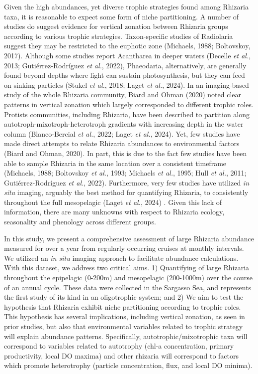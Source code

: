\documentclass[
]{article}
\begin{document}
Given the high abundances, yet diverse trophic strategies found among
Rhizaria taxa, it is reasonable to expect some form of niche
partitioning. A number of studies do suggest evidence for vertical
zonation between Rhizaria groups according to various trophic
strategies. Taxon-specific studies of Radiolaria suggest they may be
restricted to the euphotic zone (Michaels, 1988; Boltovskoy, 2017).
Although some studies report Acantharea in deeper waters (Decelle
\emph{et al.}, 2013; Gutiérrez-Rodríguez \emph{et al.}, 2022),
Phaeodaria, alternatively, are generally found beyond depths where light
can sustain photosynthesis, but they can feed on sinking particles
(Stukel \emph{et al.}, 2018; Laget \emph{et al.}, 2024). In an
imaging-based study of the whole Rhizaria community, Biard and Ohman
(2020) noted clear patterns in vertical zonation which largely
corresponded to different trophic roles. Protists communities, including
Rhizaria, have been described to partition along
autotroph-mixotroph-heterotroph gradients with increasing depth in the
water column (Blanco-Bercial \emph{et al.}, 2022; Laget \emph{et al.},
2024). Yet, few studies have made direct attempts to relate Rhizaria
abundances to environmental factors (Biard and Ohman, 2020). In part,
this is due to the fact few studies have been able to sample Rhizaria in
the same location over a consistent timeframe (Michaels, 1988;
Boltovskoy \emph{et al.}, 1993; Michaels \emph{et al.}, 1995; Hull
\emph{et al.}, 2011; Gutiérrez-Rodríguez \emph{et al.}, 2022).
Furthermore, very few studies have utilized \emph{in situ} imaging,
arguably the best method for quantifying Rhizaria, to consistently
throughout the full mesopelagic (Laget \emph{et al.}, 2024) . Given this
lack of information, there are many unknowns with respect to Rhizaria
ecology, seasonality and phenology across different groups.

In this study, we present a comprehensive assessment of large Rhizaria
abundance measured for over a year from regularly occurring cruises at
monthly intervals. We utilized an \emph{in situ} imaging approach to
facilitate abundance calculations. With this dataset, we address two
critical aims. 1) Quantifying of large Rhizaria throughout the
epipelagic (0-200m) and mesopelagic (200-1000m) over the course of an
annual cycle. These data were collected in the Sargasso Sea, and
represents the first study of its kind in an oligotrophic system; and 2)
We aim to test the hypothesis that Rhizaria exhibit niche partitioning
according to trophic roles. This hypothesis has several implications,
including vertical zonation, as seen in prior studies, but also that
environmental variables related to trophic strategy will explain
abundance patterns. Specifically, autotrophic/mixotrophic taxa will
correspond to variables related to autotrophy (chl-a concentration,
primary productivity, local DO maxima) and other rhizaria will
correspond to factors which promote heterotrophy (particle
concentration, flux, and local DO minima).
\end{document}
